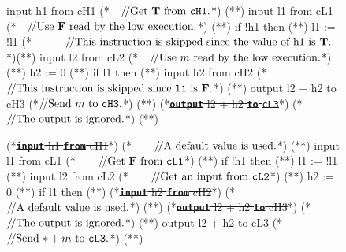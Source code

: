 \documentclass[10pt,a4paper,oneside]{article}
\def\VTRUE{\ensuremath{\textbf{T}}}
\def\VFALSE{\ensuremath{\textbf{F}}}
\def\Prog{\ensuremath{\pi}}
\def\Progl#1{\ensuremath{\Prog[#1]}}
\def\ctab{}
\def\icomment#1{\ensuremath{\ctab/\!/\textnormal{#1}}}
\def\linecode#1{{\texttt{#1}}}
\def\linecodeb#1{{\texttt{\bfseries #1}}}
\begin{document}
\begin{figure}[!t]
\begin{lrbox}{\mylistingbox}\begin{minipage}{\columnwidth}\begin{javascript}
input h1 from cH1 (*~~\icomment{Get \VTRUE\ from \linecode{cH1}.}*) (*\label{example:DI:HEx:l1}*)
input l1 from cL1 (*~~\icomment{Use \VFALSE\ read by the low execution.}*) (*\label{example:DI:HEx:l2}*)
if !h1 then       (*\label{example:DI:HEx:l3}*)
    l1 := !l1     (*~~~~~~\icomment{This instruction is skipped since the value of h1 is \VTRUE.}*)(*\label{example:DI:HEx:l4}*)
input l2 from cL2 (*~~\icomment{Use $m$ read by the low execution.}*) (*\label{example:DI:HEx:l5}*)
h2 := 0           (*\label{example:DI:HEx:l6}*)
if l1 then        (*\label{example:DI:HEx:l7}*)
    input h2 from cH2 (*\icomment{This instruction is skipped since \linecode{l1} is \VFALSE.}*)   (*\label{example:DI:HEx:l8}*)
output l2 + h2 to cH3 (*\icomment{Send $m$ to \linecode{cH3}.}*)  (*\label{example:DI:HEx:l9}*)
(*\sout{\linecodeb{output} l2 + h2 \linecodeb{to} \linecode{cL3}}*)  (*\icomment{The output is ignored.}*) (*\label{example:DI:HEx:l10}*)
\end{javascript}\end{minipage}\end{lrbox} \subfloat[The high execution \Progl{0}]{\label{fig:example:DI:execution:H}\usebox{\mylistingbox}}\begin{lrbox}{\mylistingbox}\begin{minipage}{\columnwidth}\begin{javascript}
(*\sout{\linecodeb{input} h1 \linecodeb{from} cH1}*) (*~~~~\icomment{A default value is used.}*) (*\label{example:DI:LEx:l1}*)
input l1 from cL1 (*~~~~\icomment{Get \VFALSE\ from \linecode{cL1}}*) (*\label{example:DI:LEx:l2}*)
if !h1 then (*\label{example:DI:LEx:l3}*)
    l1 := !l1 (*\label{example:DI:LEx:l4}*)
input l2 from cL2 (*~~~~\icomment{Get an input from \linecode{cL2}}*) (*\label{example:DI:LEx:l5}*)
h2 := 0 (*\label{example:DI:LEx:l6}*)
if l1 then  (*\label{example:DI:LEx:l7}*)
    (*\sout{\linecodeb{input} h2 \linecodeb{from} cH2}*) (*\icomment{A default value is used.}*) (*\label{example:DI:LEx:l8}*)
(*\sout{\linecodeb{output} l2 + h2 \linecodeb{to} cH3}*) (*\icomment{The output is ignored.}*) (*\label{example:DI:LEx:l9}*)
output l2 + h2 to cL3 (*\icomment{Send $*+m$ to \linecode{cL3}.}*)  (*\label{example:DI:LEx:l10}*)
\end{javascript}\end{minipage}\end{lrbox} \\

\end{figure}
\end{document}
